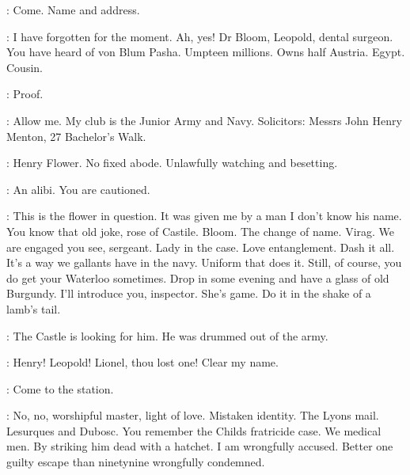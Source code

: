 \FirstWatch:
Come.
Name and address.

\Bloom:
I have forgotten for the moment.
Ah, yes!
Dr Bloom, Leopold, dental surgeon.
You have heard of von Blum Pasha.
Umpteen millions.
Owns half Austria. Egypt. Cousin.

\FirstWatch:
Proof.


\Bloom:
Allow me.
My club is the Junior Army and Navy.
Solicitors:
Messrs John Henry Menton, 27 Bachelor's Walk.

\FirstWatch:
Henry Flower.
No fixed abode.
Unlawfully watching and besetting.

\SecondWatch:
An alibi.
You are cautioned.

\Bloom:
This is the flower in question.
It was given me by a man I don't know his name.
You know that old joke, rose of Castile.
Bloom.
The change of name.
Virag.
We are engaged you see, sergeant.
Lady in the case.
Love entanglement.
Dash it all.
It's a way we gallants have in the navy.
Uniform that does it.
Still, of course, you do get your Waterloo sometimes.
Drop in some evening and have a glass of old Burgundy.
I'll introduce you, inspector.
She's game.
Do it in the shake of a lamb's tail.


\DarkMercury:
The Castle is looking for him.
He was drummed out of the army.

\Martha:
Henry! Leopold!
Lionel, thou lost one!
Clear my name.

\FirstWatch:
 Come to the station.

\Bloom:
No, no, worshipful master, light of love.
Mistaken identity.
The Lyons mail.
Lesurques and Dubosc.
You remember the Childs fratricide case.
We medical men.
By striking him dead with a hatchet.
I am wrongfully accused.
Better one guilty escape than ninetynine wrongfully condemned.

